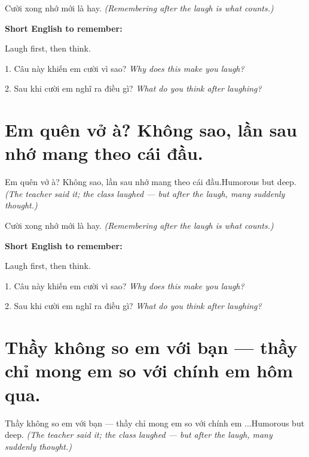 \begin{baihoc}
Cười xong nhớ mới là hay.
\textit{(Remembering after the laugh is what counts.)}
\end{baihoc}

\begin{ghinhoanh}
\textbf{Short English to remember:}

Laugh first, then think.

\end{ghinhoanh}

\begin{tuhocnhanh}
1. Câu này khiến em cười vì sao? \textit{Why does this make you laugh?}

2. Sau khi cười em nghĩ ra điều gì? \textit{What do you think after laughing?}
\end{tuhocnhanh}
\ngancach


\section{Em quên vở à? Không sao, lần sau nhớ mang theo cái đầu.}
\begin{truyen}{Em quên vở à? Không sao, lần sau nhớ mang theo cái đầu.}{Humorous but deep.}
\textit{(The teacher said it; the class laughed — but after the laugh, many suddenly thought.)}
\end{truyen}

\begin{baihoc}
Cười xong nhớ mới là hay.
\textit{(Remembering after the laugh is what counts.)}
\end{baihoc}

\begin{ghinhoanh}
\textbf{Short English to remember:}

Laugh first, then think.

\end{ghinhoanh}

\begin{tuhocnhanh}
1. Câu này khiến em cười vì sao? \textit{Why does this make you laugh?}

2. Sau khi cười em nghĩ ra điều gì? \textit{What do you think after laughing?}
\end{tuhocnhanh}
\ngancach


\section{Thầy không so em với bạn — thầy chỉ mong em so với chính em hôm qua.}
\begin{truyen}{Thầy không so em với bạn — thầy chỉ mong em so với chính em ...}{Humorous but deep.}
\textit{(The teacher said it; the class laughed — but after the laugh, many suddenly thought.)}
\end{truyen}

